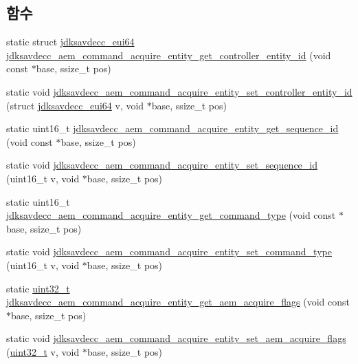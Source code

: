 \subsection*{함수}
\begin{DoxyCompactItemize}
\item 
static struct \hyperlink{structjdksavdecc__eui64}{jdksavdecc\+\_\+eui64} \hyperlink{group__command__acquire__entity_ga5eb9376430954ecd096a2ceb1fefd12b}{jdksavdecc\+\_\+aem\+\_\+command\+\_\+acquire\+\_\+entity\+\_\+get\+\_\+controller\+\_\+entity\+\_\+id} (void const $\ast$base, ssize\+\_\+t pos)
\item 
static void \hyperlink{group__command__acquire__entity_gad18ae1c174b44a9eb7c2b1f0b33aaf60}{jdksavdecc\+\_\+aem\+\_\+command\+\_\+acquire\+\_\+entity\+\_\+set\+\_\+controller\+\_\+entity\+\_\+id} (struct \hyperlink{structjdksavdecc__eui64}{jdksavdecc\+\_\+eui64} v, void $\ast$base, ssize\+\_\+t pos)
\item 
static uint16\+\_\+t \hyperlink{group__command__acquire__entity_ga3b09a68ecf04adbbe105f57f2dce5791}{jdksavdecc\+\_\+aem\+\_\+command\+\_\+acquire\+\_\+entity\+\_\+get\+\_\+sequence\+\_\+id} (void const $\ast$base, ssize\+\_\+t pos)
\item 
static void \hyperlink{group__command__acquire__entity_ga5162a99e4f96b27c114bb02cbfc9897e}{jdksavdecc\+\_\+aem\+\_\+command\+\_\+acquire\+\_\+entity\+\_\+set\+\_\+sequence\+\_\+id} (uint16\+\_\+t v, void $\ast$base, ssize\+\_\+t pos)
\item 
static uint16\+\_\+t \hyperlink{group__command__acquire__entity_ga6ae35802953cba085b90b700fdd45e0b}{jdksavdecc\+\_\+aem\+\_\+command\+\_\+acquire\+\_\+entity\+\_\+get\+\_\+command\+\_\+type} (void const $\ast$base, ssize\+\_\+t pos)
\item 
static void \hyperlink{group__command__acquire__entity_ga9002998e7b58580616df7e0fe014e987}{jdksavdecc\+\_\+aem\+\_\+command\+\_\+acquire\+\_\+entity\+\_\+set\+\_\+command\+\_\+type} (uint16\+\_\+t v, void $\ast$base, ssize\+\_\+t pos)
\item 
static \hyperlink{parse_8c_a6eb1e68cc391dd753bc8ce896dbb8315}{uint32\+\_\+t} \hyperlink{group__command__acquire__entity_ga3fadacd92322feae73076b9325d313a5}{jdksavdecc\+\_\+aem\+\_\+command\+\_\+acquire\+\_\+entity\+\_\+get\+\_\+aem\+\_\+acquire\+\_\+flags} (void const $\ast$base, ssize\+\_\+t pos)
\item 
static void \hyperlink{group__command__acquire__entity_gaa7a3f18e047eb974ac0c00c6daf19b2a}{jdksavdecc\+\_\+aem\+\_\+command\+\_\+acquire\+\_\+entity\+\_\+set\+\_\+aem\+\_\+acquire\+\_\+flags} (\hyperlink{parse_8c_a6eb1e68cc391dd753bc8ce896dbb8315}{uint32\+\_\+t} v, void $\ast$base, ssize\+\_\+t pos)

\end{DoxyCompactItemize}
